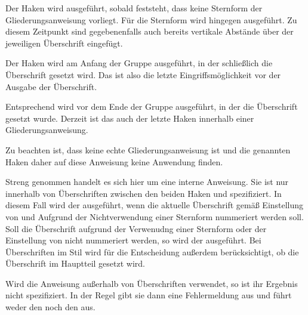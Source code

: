 Der Haken 
 wird ausgeführt, sobald feststeht,
dass keine Sternform der Gliederungsanweisung vorliegt. Für die Sternform wird
hingegen  ausgeführt. Zu diesem
Zeitpunkt sind gegebenenfalls auch bereits vertikale Abstände über der
jeweiligen Überschrift eingefügt.

Der Haken
 wird am Anfang der Gruppe
ausgeführt, in der schließlich die Überschrift gesetzt wird. Das ist also die
letzte Eingriffsmöglichkeit vor der Ausgabe der Überschrift.

Entsprechend wird
 vor dem Ende der Gruppe ausgeführt, in
der die Überschrift gesetzt wurde. Derzeit ist das auch der letzte Haken
innerhalb einer Gliederungsanweisung.

Zu beachten ist, dass
 keine echte Gliederungsanweisung ist und die
genannten Haken daher auf diese Anweisung keine Anwendung finden.%
\EndIndexGroup


\begin{Declaration}
\end{Declaration}
Streng genommen handelt es sich hier um eine interne
Anweisung. Sie ist nur innerhalb von Überschriften zwischen den beiden Haken
 und 
spezifiziert. In diesem Fall wird der  ausgeführt, wenn die
aktuelle Überschrift gemäß Einstellung von
 und Aufgrund der Nichtverwendung einer
Sternform nummeriert werden soll. Soll die Überschrift aufgrund der Verwenudng
einer Sternform oder der Einstellung von 
nicht nummeriert werden, so wird der  ausgeführt. Bei
Überschriften im Stil  wird für die Entscheidung außerdem
berücksichtigt, ob die Überschrift im Hauptteil gesetzt wird.

Wird die Anweisung außerhalb von
Überschriften verwendet, so ist ihr Ergebnis nicht spezifiziert. In der Regel
gibt sie dann eine Fehlermeldung aus und führt weder den 
noch den  aus.%
\EndIndexGroup


